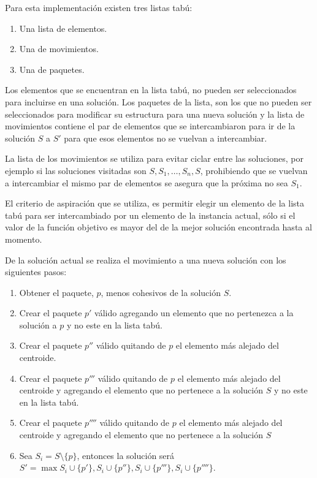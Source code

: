 Para esta implementación existen tres listas tabú: 
\begin{enumerate}
	\item Una lista de elementos.
	\item Una de movimientos.
	\item Una de paquetes.
\end{enumerate}

Los elementos que se encuentran en la lista tabú, no pueden ser seleccionados para incluirse en una solución. Los paquetes de la lista, son los que no pueden ser seleccionados para modificar su estructura para una nueva solución y la lista de movimientos contiene el par de elementos que se intercambiaron para ir de la solución $S$ a $S'$ para que esos elementos no se vuelvan a intercambiar.

La lista de los movimientos se utiliza para evitar ciclar entre las soluciones, por ejemplo si las soluciones visitadas son $S, S_1, \ldots, S_n, S$, prohibiendo que se vuelvan a intercambiar el mismo par de elementos se asegura que la próxima no sea $S_1$.

El criterio de aspiración que se utiliza, es permitir elegir un elemento de la lista tabú para ser intercambiado por un elemento de la instancia actual, sólo si el valor de la función objetivo es mayor del de la mejor solución encontrada hasta al momento.

De la solución actual se realiza el movimiento a una nueva solución con los siguientes pasos:
\begin{enumerate}
	\item Obtener el paquete, $p$, menos cohesivos de la solución $S$.
	\item Crear el paquete $p'$ válido agregando un elemento que no pertenezca a la solución a $p$ y no este en la lista tabú.
	\item Crear el paquete $p''$ válido quitando de $p$ el elemento más alejado del centroide.
	\item Crear el paquete $p'''$ válido quitando de $p$ el elemento más alejado del centroide y agregando el elemento que no pertenece a la solución $S$ y no este en la lista tabú.
	\item Crear el paquete $p''''$ válido quitando de $p$ el elemento más alejado del centroide y agregando el elemento que no pertenece a la solución $S$
	\item Sea $S_{i} = S\setminus \{p\}$, entonces la solución será\\
	$S' = \max{S_{i}\cup\{p'\}, S_{i}\cup\{p''\}, S_{i}\cup\{p'''\}, S_{i}\cup\{p''''\}}$.
\end{enumerate}

